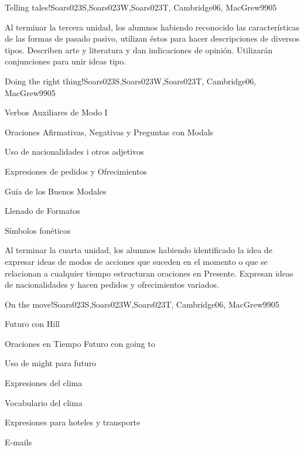 \begin{syllabus}
\begin{unit}{Telling tales!}{Soars023S,Soars023W,Soars023T, Cambridge06, MacGrew99}{0}{5}
   \begin{learningoutcomes}
      \item Al terminar la tercera unidad, los alumnos habiendo reconocido las 
            características  de las formas de pasado pasivo, utilizan éstos para 
            hacer descripciones de diversos tipos. Describen arte y literatura y 
            dan indicaciones de opinión. Utilizarán conjunciones para unir ideas tipo. 
   \end{learningoutcomes}
\end{unit}

\begin{unit}{Doing the right thing!}{Soars023S,Soars023W,Soars023T, Cambridge06, MacGrew99}{0}{5}
   \begin{topics}
      \item Verbos Auxiliares de Modo I
      \item Oraciones Afirmativas, Negativas y Preguntas con Modals
      \item Uso de nacionalidades i otros adjetivos
      \item Expresiones de pedidos y Ofrecimientos
      \item Guí­a de los Buenos Modales
      \item Llenado de Formatos
      \item Sí­mbolos fonéticos
   \end{topics}

   \begin{learningoutcomes}
      \item Al terminar la cuarta unidad, los alumnos habiendo identificado la idea de expresar ideas de modos de acciones que suceden en el momento o que se relacionan a cualquier tiempo estructuran oraciones en Presente. Expresan ideas de nacionalidades y hacen pedidos y ofrecimientos variados.
   \end{learningoutcomes}

\end{unit}

\begin{unit}{On the move!}{Soars023S,Soars023W,Soars023T, Cambridge06, MacGrew99}{0}{5}
   \begin{topics}
      \item Futuro con Hill
      \item Oraciones en Tiempo Futuro con going to
      \item Uso de might para futuro
      \item Expresiones del clima
      \item Vocabulario del clima
      \item Expresiones para hoteles y transporte
      \item E-mails
   \end{topics}


\end{unit}
\end{syllabus}
